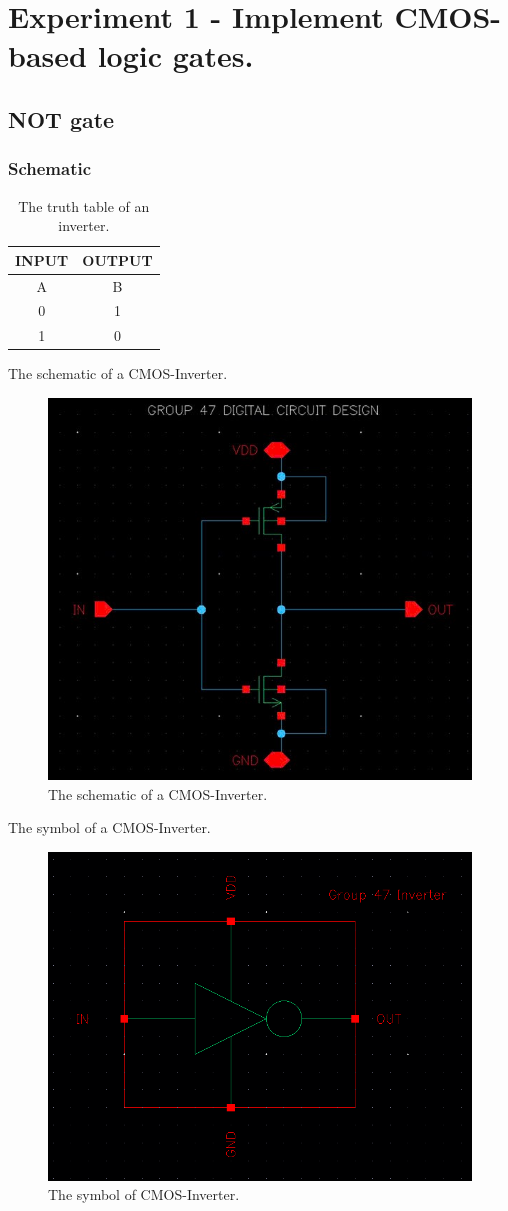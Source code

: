 \section{Experiment 1 - Implement CMOS-based logic gates.}

\subsection{NOT gate}

\subsubsection{Schematic}

\begin{table}[H]
	\centering
	\begin{tabular}{|c|c|}
		\hline
		INPUT & OUTPUT \\
		\hline
		A & B \\
		\hline
		0 & 1 \\
		\hline
		1 & 0\\
		\hline
	\end{tabular}
	\caption{The truth table of an inverter.}
	\label{t_the truth table of inverter}
\end{table}

The schematic of a CMOS-Inverter.

\begin{figure}[H]
	\centering
	\includegraphics[width=.6\linewidth]{section/EX1/INV/EX1_INV_schematic.png}
	\caption{The schematic of a CMOS-Inverter.}
	\label{f_EX1_INV_schematic}
\end{figure} 

The symbol of a CMOS-Inverter.

\begin{figure}[H]
	\centering
	\includegraphics[width=.6\linewidth]{section/EX1/INV/EX1_INV_symbol.png}
	\caption{The symbol of CMOS-Inverter.}
	\label{f_EX1_INV_symbol}
\end{figure}

